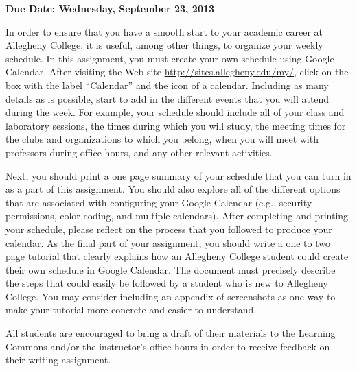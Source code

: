 

\usepackage[compact]{titlesec}



\vspace*{-.2in}
\begin{center}
	{\bf Due Date: Wednesday, September 23, 2013}
\end{center}

In order to ensure that you have a smooth start to your academic career at Allegheny College, it is useful, among other
things, to organize your weekly schedule. In this assignment, you must create your own schedule using Google Calendar.
After visiting the Web site \url{http://sites.allegheny.edu/my/}, click on the box with the label ``Calendar'' and the
icon of a calendar. Including as many details as is possible, start to add in the different events that you will attend
during the week. For example, your schedule should include all of your class and laboratory sessions, the times during
which you will study, the meeting times for the clubs and organizations to which you belong, when you will meet with
professors during office hours, and any other relevant activities.

Next, you should print a one page summary of your schedule that you can turn in as a part of this assignment. You should
also explore all of the different options that are associated with configuring your Google Calendar (e.g., security
permissions, color coding, and multiple calendars). After completing and printing your schedule, please reflect on the
process that you followed to produce your calendar. As the final part of your assignment, you should write a one to two
page tutorial that clearly explains how an Allegheny College student could create their own schedule in Google Calendar.
The document must precisely describe the steps that could easily be followed by a student who is new to Allegheny
College. You may consider including an appendix of screenshots as one way to make your tutorial more concrete and easier
to understand.

All students are encouraged to bring a draft of their materials to the Learning Commons and/or the instructor's office
hours in order to receive feedback on their writing assignment.



